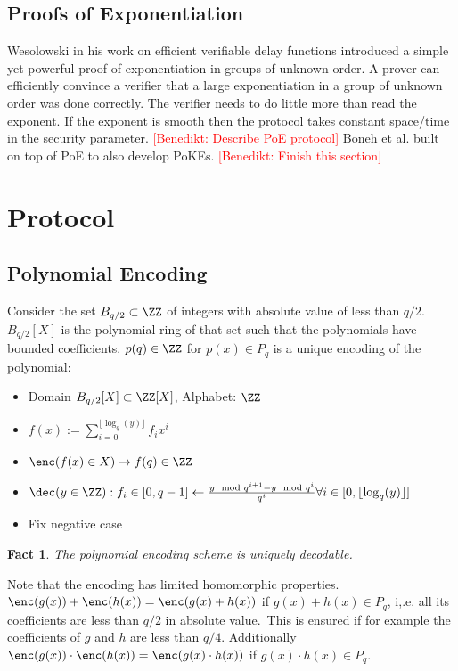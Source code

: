 \documentclass{article}
\newtheorem{fact}{Fact}
\newcommand{\benedikt}[1]{{\textcolor{red}{[Benedikt: #1]}}}
\newcommand{\benedikt}[1]{}
\begin{document}
\subsection{Proofs of Exponentiation}
Wesolowski \cite{EC:Wesolowski19} in his work on efficient verifiable delay functions introduced a simple yet powerful proof of exponentiation in groups of unknown order. A prover can efficiently convince a verifier that a large exponentiation in a group of unknown order was done correctly. The verifier needs to do little more than read the exponent. If the exponent is smooth then the protocol takes constant space/time in the security parameter.
\benedikt{Describe PoE protocol}
Boneh et al. \cite{journals/iacr/BonehBF18a} built on top of PoE to also develop PoKEs. \benedikt{Finish this section}
\section{Protocol}
\label{sec:protocol}

\subsection{Polynomial Encoding}

	Consider the set $B_{q/2}\subset \ZZ$ of integers with absolute value of less than $q/2$. $B_{q/2}[X]$ is the polynomial ring of that set such that the polynomials have bounded coefficients. $p(q) \in \ZZ$ for $p(x)\in P_q$ is a unique encoding of the polynomial:
\begin{itemize}
	\item Domain $B_{q/2}[X]\subset \ZZ[X]$, Alphabet: $\ZZ$
	\item 	$f(x):=\sum_{i=0}^{\lfloor\log_q(y)\rfloor} f_i x^i$
	\item $\enc(f(x) \in X)\rightarrow  f(q) \in \ZZ$
	\item $\dec(y \in \ZZ): f_i \in [0,q-1]\gets \frac{y \mod q^{i+1}-y \mod q^{i}}{q^i} \forall i \in [0,\lfloor\log_q(y)\rfloor]$
	\item Fix negative case
\end{itemize}

\begin{fact}
	The polynomial encoding scheme is uniquely decodable.
\end{fact}

Note that the encoding has limited homomorphic properties. $\enc(g(x))+\enc(h(x))=\enc(g(x)+h(x))$ if $g(x)+h(x)\in P_q$, i,.e. all its coefficients are less than $q/2$ in absolute value.\ This is ensured if for example the coefficients of $g$ and $h$ are less than $q/4$. Additionally $\enc(g(x))\cdot \enc(h(x))=\enc(g(x)\cdot h(x))$ if $g(x)\cdot h(x)\in P_q$.
\end{document}
